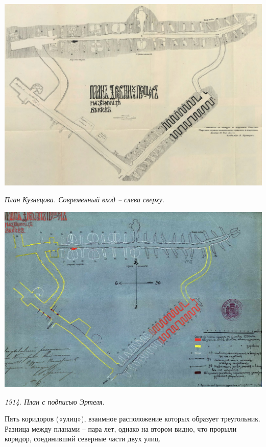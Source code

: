 \begin{center}
\includegraphics[width=\linewidth]{chast-colebanie-osnov/nachalo/zverp-plan02.jpg}

\textit{План Кузнецова. Современный вход – слева сверху.}
\end{center}

\begin{center}
\includegraphics[width=\linewidth]{chast-colebanie-osnov/nachalo/1914-ertel.jpg}

\textit{1914. План с подписью Эртеля.}
\end{center}

\vspace*{\fill}
\newpage

Пять коридоров («улиц»), взаимное расположение которых образует треугольник. Разница между планами – пара лет, однако на втором видно, что прорыли коридор, соединивший северные части двух улиц.

